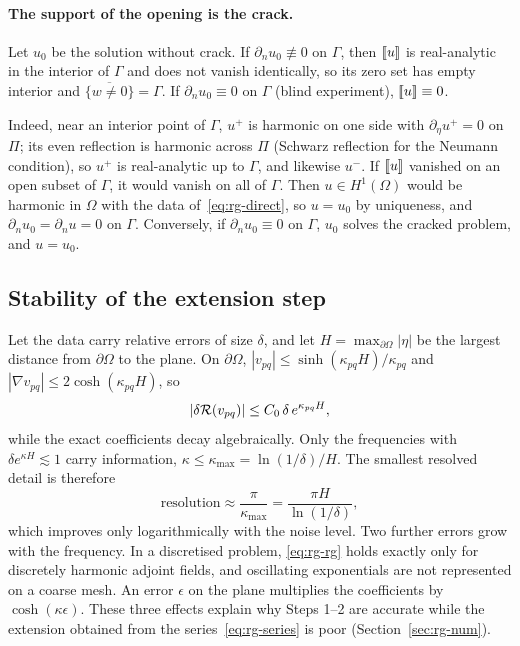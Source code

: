 \paragraph{The support of the opening is the crack.} Let $u_0$ be the solution without crack. If $\partial_nu_0\not\equiv0$ on $\Gamma$, then $[\![u]\!]$ is real-analytic in the interior of $\Gamma$ and does not vanish identically, so its zero set has empty interior and $\overline{\{w\ne0\}}=\Gamma$. If $\partial_nu_0\equiv0$ on $\Gamma$ (blind experiment), $[\![u]\!]\equiv0$.

Indeed, near an interior point of $\Gamma$, $u^+$ is harmonic on one side with $\partial_\eta u^+=0$ on $\Pi$; its even reflection is harmonic across $\Pi$ (Schwarz reflection for the Neumann condition), so $u^+$ is real-analytic up to $\Gamma$, and likewise $u^-$. If $[\![u]\!]$ vanished on an open subset of $\Gamma$, it would vanish on all of $\Gamma$. Then $u\in H^1(\Omega)$ would be harmonic in $\Omega$ with the data of~\eqref{eq:rg-direct}, so $u=u_0$ by uniqueness, and $\partial_nu_0=\partial_nu=0$ on $\Gamma$. Conversely, if $\partial_nu_0\equiv0$ on $\Gamma$, $u_0$ solves the cracked problem, and $u=u_0$.

\subsection{Stability of the extension step}\label{ssec:rg-stab}
%
Let the data carry relative errors of size $\delta$, and let $H=\max_{\partial\Omega}|\eta|$ be the largest distance from $\partial\Omega$ to the plane. On $\partial\Omega$, $|v_{pq}|\le\sinh(\kappa_{pq}H)/\kappa_{pq}$ and $|\nabla v_{pq}|\le2\cosh(\kappa_{pq}H)$, so
\begin{equation}\label{eq:rg-stab}
|\delta\mathcal{R}(v_{pq})|\le C_0\,\delta\,e^{\kappa_{pq}H},
\end{equation}
while the exact coefficients decay algebraically. Only the frequencies with $\delta e^{\kappa H}\lesssim1$ carry information, $\kappa\le\kappa_{\max}=\ln(1/\delta)/H$. The smallest resolved detail is therefore
\begin{equation}\label{eq:rg-res}
\text{resolution}\approx\frac{\pi}{\kappa_{\max}}=\frac{\pi H}{\ln(1/\delta)} ,
\end{equation}
which improves only logarithmically with the noise level. Two further errors grow with the frequency. In a discretised problem, \eqref{eq:rg-rg} holds exactly only for discretely harmonic adjoint fields, and oscillating exponentials are not represented on a coarse mesh. An error $\epsilon$ on the plane multiplies the coefficients by $\cosh(\kappa\epsilon)$. These three effects explain why Steps 1--2 are accurate while the extension obtained from the series~\eqref{eq:rg-series} is poor (Section~\ref{sec:rg-num}).

